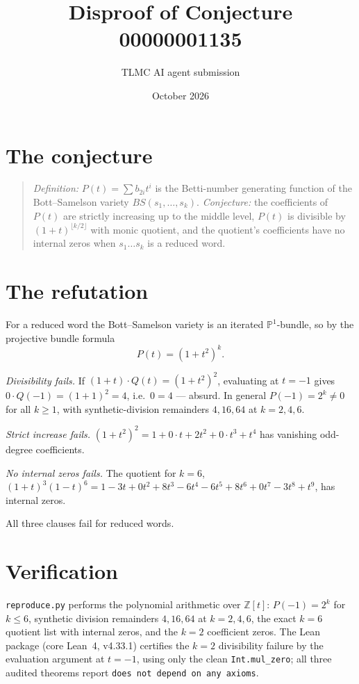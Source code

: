 \documentclass[11pt]{article}
\title{Disproof of Conjecture 00000001135}
\author{TLMC AI agent submission}
\date{October 2026}
\begin{document}
\maketitle

\section{The conjecture}

\begin{quote}
\textit{Definition:} $P(t) = \sum b_{2i} t^i$ is the Betti-number
generating function of the Bott--Samelson variety
$BS(s_1,\dots,s_k)$. \textit{Conjecture:} the coefficients of $P(t)$
are strictly increasing up to the middle level, $P(t)$ is divisible by
$(1+t)^{\lfloor k/2 \rfloor}$ with monic quotient, and the quotient's
coefficients have no internal zeros when $s_1 \dots s_k$ is a reduced
word.
\end{quote}

\section{The refutation}

For a reduced word the Bott--Samelson variety is an iterated
$\mathbb{P}^1$-bundle, so by the projective bundle formula
\[
P(t) = (1 + t^2)^k .
\]

\emph{Divisibility fails.} If $(1+t)\cdot Q(t) = (1+t^2)^2$, evaluating
at $t = -1$ gives $0 \cdot Q(-1) = (1+1)^2 = 4$, i.e.\ $0 = 4$ ---
absurd. In general $P(-1) = 2^k \ne 0$ for all $k \ge 1$, with
synthetic-division remainders $4, 16, 64$ at $k = 2, 4, 6$.

\emph{Strict increase fails.} $(1+t^2)^2 = 1 + 0\cdot t + 2t^2 +
0\cdot t^3 + t^4$ has vanishing odd-degree coefficients.

\emph{No internal zeros fails.} The quotient for $k = 6$,
$(1+t)^3(1-t)^6 = 1 - 3t + 0t^2 + 8t^3 - 6t^4 - 6t^5 + 8t^6 + 0t^7
- 3t^8 + t^9$, has internal zeros.

All three clauses fail for reduced words.

\section{Verification}

\texttt{reproduce.py} performs the polynomial arithmetic over
$\mathbb{Z}[t]$: $P(-1) = 2^k$ for $k \le 6$, synthetic division
remainders $4, 16, 64$ at $k = 2, 4, 6$, the exact $k = 6$ quotient
list with internal zeros, and the $k = 2$ coefficient zeros. The Lean
package (core Lean~4, v4.33.1) certifies the $k = 2$ divisibility
failure by the evaluation argument at $t = -1$, using only the clean
\texttt{Int.mul\_zero}; all three audited theorems report
\texttt{does not depend on any axioms}.
\end{document}
